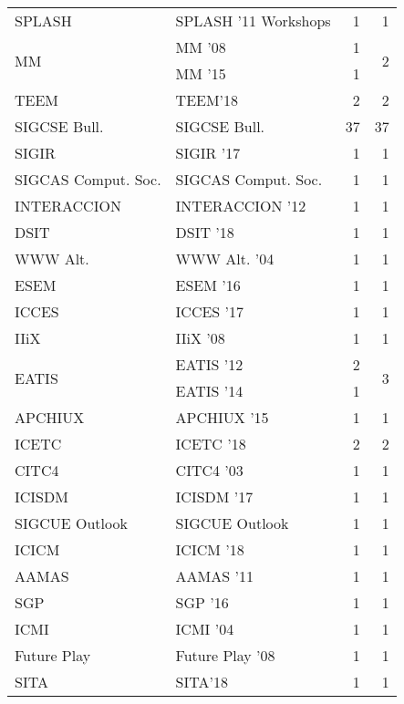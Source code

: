 \begin{table*}[t]
\begin{tabular}{llrr}
\multirow{1}{*}{SPLASH } & SPLASH '11 Workshops & 1 & \multirow{1}{*}{1}\\
\multirow{2}{*}{MM } & MM '08 & 1 & \multirow{2}{*}{2}\\
& MM '15 & 1 &\\
\multirow{1}{*}{TEEM} & TEEM'18 & 2 & \multirow{1}{*}{2}\\
\multirow{1}{*}{SIGCSE Bull.} & SIGCSE Bull. & 37 & \multirow{1}{*}{37}\\
\multirow{1}{*}{SIGIR } & SIGIR '17 & 1 & \multirow{1}{*}{1}\\
\multirow{1}{*}{SIGCAS Comput. Soc.} & SIGCAS Comput. Soc. & 1 & \multirow{1}{*}{1}\\
\multirow{1}{*}{INTERACCION } & INTERACCION '12 & 1 & \multirow{1}{*}{1}\\
\multirow{1}{*}{DSIT } & DSIT '18 & 1 & \multirow{1}{*}{1}\\
\multirow{1}{*}{WWW Alt. } & WWW Alt. '04 & 1 & \multirow{1}{*}{1}\\
\multirow{1}{*}{ESEM } & ESEM '16 & 1 & \multirow{1}{*}{1}\\
\multirow{1}{*}{ICCES } & ICCES '17 & 1 & \multirow{1}{*}{1}\\
\multirow{1}{*}{IIiX } & IIiX '08 & 1 & \multirow{1}{*}{1}\\
\multirow{2}{*}{EATIS } & EATIS '12 & 2 & \multirow{2}{*}{3}\\
& EATIS '14 & 1 &\\
\multirow{1}{*}{APCHIUX } & APCHIUX '15 & 1 & \multirow{1}{*}{1}\\
\multirow{1}{*}{ICETC } & ICETC '18 & 2 & \multirow{1}{*}{2}\\
\multirow{1}{*}{CITC4 } & CITC4 '03 & 1 & \multirow{1}{*}{1}\\
\multirow{1}{*}{ICISDM } & ICISDM '17 & 1 & \multirow{1}{*}{1}\\
\multirow{1}{*}{SIGCUE Outlook} & SIGCUE Outlook & 1 & \multirow{1}{*}{1}\\
\multirow{1}{*}{ICICM } & ICICM '18 & 1 & \multirow{1}{*}{1}\\
\multirow{1}{*}{AAMAS } & AAMAS '11 & 1 & \multirow{1}{*}{1}\\
\multirow{1}{*}{SGP } & SGP '16 & 1 & \multirow{1}{*}{1}\\
\multirow{1}{*}{ICMI } & ICMI '04 & 1 & \multirow{1}{*}{1}\\
\multirow{1}{*}{Future Play } & Future Play '08 & 1 & \multirow{1}{*}{1}\\
\multirow{1}{*}{SITA} & SITA'18 & 1 & \multirow{1}{*}{1}\\

\end{tabular}
\end{table*}
